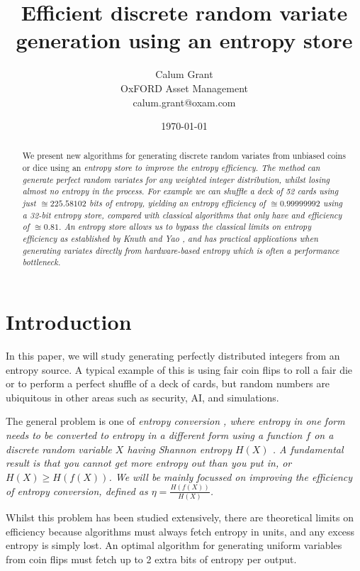 \documentclass[12pt]{article}
\title{Efficient discrete random variate generation using an entropy store}
\author{Calum Grant \\
OxFORD Asset Management \\
calum.grant@oxam.com}
\date{\today}
\begin{document}
\maketitle

\begin{abstract}
    We present new algorithms for generating discrete random variates from unbiased coins or dice using an \em entropy store \em to improve the entropy efficiency. The method can generate perfect random variates for any weighted integer distribution, whilst losing almost no entropy in the process.  For example we can shuffle a deck of 52 cards using just $\approxeq 225.58102$ bits of entropy, yielding an entropy  efficiency of $\approxeq 0.99999992$ using a 32-bit entropy store, compared with classical algorithms that only have and efficiency of $\approxeq 0.81$. An entropy store allows us to bypass the classical limits on entropy efficiency as established by Knuth and Yao \cite{Knuth1976TheCO}, and has practical applications when generating variates directly from hardware-based entropy which is often a performance bottleneck.    
\end{abstract}

\section{Introduction}

In this paper, we will study generating perfectly distributed integers from an entropy source. A typical example of this is using fair coin flips to roll a fair die or to perform a perfect shuffle of a deck of cards, but random numbers are ubiquitous in other areas such as security, AI, and simulations.

The general problem is one of \em entropy conversion \em, where entropy in one form needs to be converted to entropy in a different form using a function $f$ on a discrete random variable $X$ having Shannon entropy $H(X)$
\cite{shannon1948mathematical}.  
A fundamental result is that you cannot get more entropy out than you put in, or $H(X) \ge H(f(X))$. \cite{cover1999elements} 
We will be mainly focussed on improving the \em efficiency \em of entropy conversion, defined as $\eta = \frac{H(f(X))}{H(X)}$.

Whilst this problem has been studied extensively, there are theoretical limits on efficiency because algorithms must always fetch entropy in units, and any excess entropy is simply lost. An optimal algorithm for generating uniform variables from coin flips must fetch up to 2 extra bits of entropy per output.  \cite{cover1999elements, Knuth1976TheCO}
\end{document}
